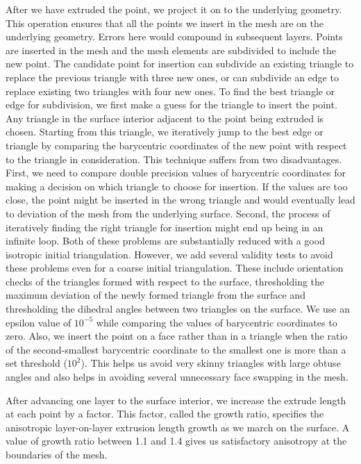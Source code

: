 \documentclass[conf]{new-aiaa}
\begin{document}
After we have extruded the point, we project it on to the underlying geometry. This operation ensures that all the  points we insert in the mesh are on the underlying geometry. Errors here would compound in subsequent layers. Points are inserted in the mesh and the mesh elements are subdivided to include the new point. The candidate point for insertion can subdivide an existing triangle to replace the previous triangle with three new ones, or can subdivide an edge to replace existing two triangles with four new ones. To find the best triangle or edge for subdivision, we first make a guess for the triangle to insert the point. Any triangle in the surface interior adjacent to the point being extruded is chosen. Starting from this triangle, we iteratively jump to the best edge or triangle by comparing the barycentric coordinates of the new point with respect to the triangle in consideration. This technique suffers from two disadvantages. First, we need to compare double precision values of barycentric coordinates for making a decision on which triangle to choose for insertion. If the values are too close, the point might be inserted in the wrong triangle and would eventually lead to deviation of the mesh from the underlying surface. Second, the process of iteratively finding the right triangle for insertion might end up being in an infinite loop. Both of these problems are substantially reduced with a good isotropic initial triangulation. However, we add several validity tests to avoid these problems even for a coarse initial triangulation. These include orientation checks of the triangles formed with respect to the surface, thresholding the maximum deviation of the newly formed triangle from the surface and thresholding the dihedral angles between two triangles on the surface. We use an epsilon value of $10^{-5}$ while comparing the values of barycentric coordinates to zero. Also, we insert the point on a face rather than in a triangle when the ratio of the second-smallest barycentric coordinate to the smallest one is more than a set threshold ($10^2$). This helps us avoid very skinny triangles with large obtuse angles and also helps in avoiding several unnecessary face swapping in the mesh.

After advancing one layer to the surface interior, we increase the extrude length at each point by a factor. This factor, called the growth ratio, specifies the anisotropic layer-on-layer extrusion length growth as we march on the surface. A value of growth ratio between 1.1 and 1.4 gives us satisfactory anisotropy at the boundaries of the mesh.
\end{document}
